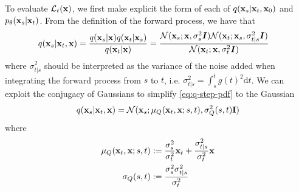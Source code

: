 To evaluate $\mathcal{L}_t({\mathbf{x}})$, we first make explicit the form of each of $q({\mathbf{x}}_{s} | {\mathbf{x}}_{t}, {\mathbf{x}}_0)$ and $p_\theta({\mathbf{x}}_{s} | {\mathbf{x}}_{t})$. From the definition of the forward process, we have that
\begin{align} \label{eq:q-step-pdf}
    q({\mathbf{x}}_{s} | {\mathbf{x}}_{t}, {\mathbf{x}}) &= \frac{q({\mathbf{x}}_{s} | {\mathbf{x}}) q({\mathbf{x}}_{t} | {\mathbf{x}}_{s})}{q({\mathbf{x}}_{t}|{\mathbf{x}})} = \frac{{\mathcal{N}}({\mathbf{x}}_{s}; {\mathbf{x}}, \sigma_{s}^2 {\bm{I}}) {\mathcal{N}}({\mathbf{x}}_{t}; {\mathbf{x}}_{s}, \sigma_{t|s}^2 {\bm{I}}) }{{\mathcal{N}}({\mathbf{x}}_{t}; {\mathbf{x}}, \sigma_{t}^2 {\bm{I}})}
\end{align}
where $\sigma_{t|s}^2$ should be interpreted as the variance of the noise added when integrating the forward process from $s$ to $t$, i.e. $\sigma_{t|s}^2 = \int_{s}^{t} g(t)^2 \mathrm{d}t$. We can exploit the conjugacy of Gaussians to simplify \cref{eq:q-step-pdf} to the Gaussian
\begin{align}
    q({\mathbf{x}}_s|{\mathbf{x}}_t,{\mathbf{x}}) = {\mathcal{N}}( {\mathbf{x}}_s; \mathbf{\mu}_Q({\mathbf{x}}_t, {\mathbf{x}}; s, t), \sigma_Q^2(s, t) \mathbf{I})
\end{align}
where
\begin{align} \nonumber
    \mathbf{\mu}_Q({\mathbf{x}}_t, {\mathbf{x}}; s, t) &:= \frac{\sigma_s^2}{\sigma_t^2} {\mathbf{x}}_t + \frac{\sigma_{t|s}^2}{\sigma_t^2} {\mathbf{x}} \\
    \sigma_Q(s, t) &:= \frac{\sigma_s^2 \sigma_{t|s}^2}{\sigma_t^2}
\end{align}


